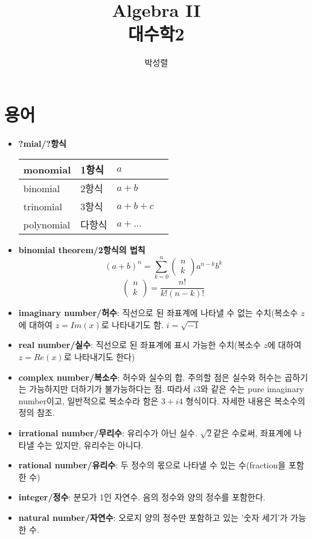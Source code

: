 \documentclass{article}
\title{Algebra II \\대수학2}
\author{박성렬}
\begin{document}
\maketitle

\section{용어}
\begin{itemize}
\item \textbf{?mial/?항식}\\
\begin{tabular} {| l | l | l | l |}
\hline
monomial & 1항식 & $a$\\
\hline
binomial & 2항식 & $a+b$\\
\hline
trinomial & 3항식 & $a+b+c$\\
\hline
polynomial & 다항식 & $a+...$\\
\hline
\end{tabular}

\item \textbf{binomial theorem/2항식의 법칙}
$$(a+b)^{n}= \sum_{k=0}^{n} \begin{pmatrix}n \\ k \end{pmatrix} a^{n-k}b^{k}$$
$$\begin{pmatrix} n \\k \end{pmatrix}=\dfrac{n!}{k!(n-k)!} $$
\item \textbf{imaginary number/허수}:
직선으로 된 좌표계에 나타낼 수 없는 수치(복소수 $z$에 대하여 $z=Im(x)$로 나타내기도 함. $i=\sqrt{-1}$

\item \textbf{real number/실수}:
직선으로 된 좌표계에 표시 가능한 수치(복소수 $z$에 대하여 $z=Re(x)$로 나타내기도 한다)

\item \textbf{complex number/복소수}:
허수와 실수의 합. 주의할 점은 실수와 허수는 곱하기는 가능하지만 더하기가 불가능하다는 점. 따라서 $i3$와 같은 수는 pure imaginary number이고, 일반적으로 복소수라 함은 $3+i4$ 형식이다. 자세한 내용은 복소수의 정의 참조.

\item \textbf{irrational number/무리수}:
유리수가 아닌 실수. $\sqrt{2}$같은 수로써, 좌표계에 나타낼 수는 있지만, 유리수는 아니다.

\item \textbf{rational number/유리수}:
두 정수의 몫으로 나타낼 수 있는 수(fraction을 포함한 수)

\item \textbf{integer/정수}:
분모가 1인 자연수. 음의 정수와 양의 정수를 포함한다.

\item \textbf{natural number/자연수}:
오로지 양의 정수만 포함하고 있는 '숫자 세기'가 가능한 수.
\end{itemize}
\end{document}
